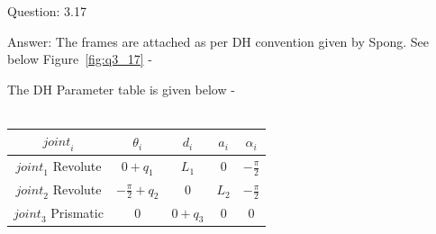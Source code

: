\documentclass[a4paper]{article}
\begin{document}
\begin{qalist}
		\newpage	
		\item[Question: 3.17] \setcounter{equation}{0} %
		\item[Answer:] The frames are attached as per DH convention given by Spong. See below Figure~\ref{fig:q3_17} -\\
			\begin{minipage}{\linewidth}
				\vspace{0.5cm}
				\centering
				\label{fig:q3_17}
				\vspace{0.5cm}
			\end{minipage}
			The DH Parameter table is given below - \\ \\
			\begin{minipage}{\linewidth}
				\centering
				\begin{tabular}{|c|c|c|c|c|}
					\hline
					${joint}_{i}$ & ${\theta}_{i}$ & ${d}_{i}$ & ${a}_{i}$ & ${\alpha}_{i}$\\
					\hline
					${joint}_{1}$ Revolute & $0 + {q}_{1}$ & ${L}_{1}$ & $0$ & $-\frac{\pi}{2}$\\
					\hline
					${joint}_{2}$ Revolute & $-\frac{\pi}{2} + {q}_{2}$ & $0$ & ${L}_{2}$ & $-\frac{\pi}{2}$\\
					\hline
					${joint}_{3}$ Prismatic & $0$ & $0 + {q}_{3}$ & $0$ & $0$\\
					\hline
				\end{tabular}
			\end{minipage}	
	\end{qalist}
\end{document}

